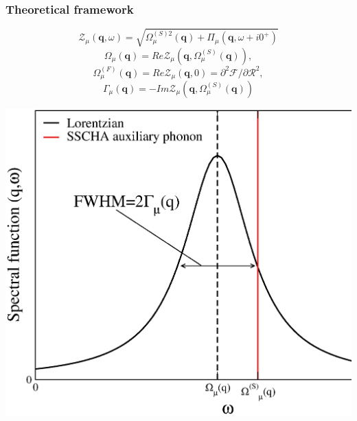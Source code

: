 \documentclass{beamer}
\begin{document}
\begin{frame}

\frametitle{Theoretical framework}
\vspace{-0.2cm}
\begin{equation}
\nonumber
\mathcal{Z}_{\mu}(\mathbf{q},\omega)=\sqrt{\Omega_{\mu}^{(S)2}(\mathbf{q})+\Pi_{\mu}(\mathbf{q},\omega+i0^{+})}
\end{equation}
\begin{equation}
\nonumber
\Omega_{\mu}(\mathbf{q})=Re\mathcal{Z}_{\mu}(\mathbf{q},\Omega^{(S)}_{\mu}(\mathbf{q})),
\end{equation}
\begin{equation}
\nonumber
\Omega_{\mu}^{(F)}(\mathbf{q})=Re\mathcal{Z}_{\mu}(\mathbf{q},0)=\partial^{2}\mathcal{F}/\partial \boldsymbol{\mathcal{R}}^{2},
\end{equation}
\begin{equation}
\nonumber
\Gamma_{\mu}(\mathbf{q})=-Im\mathcal{Z}_{\mu}(\mathbf{q},\Omega^{(S)}_{\mu}(\mathbf{q}))
\end{equation}
\begin{center}
  \includegraphics[width=0.55\linewidth]{Pictures/THEORY/ins-toy2.eps}
 \end{center}

\end{frame}

\end{document}

